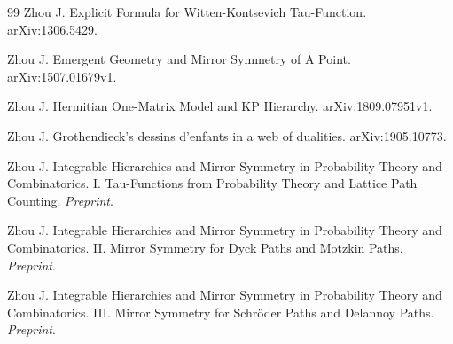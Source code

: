 \documentclass[a4paper]{article}
\theoremstyle{plain}
\theoremstyle{definition}
\begin{document}
\begin{thebibliography}{99}
Zhou J. Explicit Formula for Witten-Kontsevich Tau-Function. arXiv:1306.5429.

Zhou J. Emergent Geometry and Mirror Symmetry of A Point. arXiv:1507.01679v1.

Zhou J. Hermitian One-Matrix Model and KP Hierarchy. arXiv:1809.07951v1.

Zhou J. Grothendieck's dessins d'enfants in a web of dualities. arXiv:1905.10773.

Zhou J. Integrable Hierarchies and Mirror Symmetry in Probability Theory and Combinatorics. I. Tau-Functions from Probability Theory and Lattice Path Counting. {\it Preprint}.

Zhou J. Integrable Hierarchies and Mirror Symmetry in Probability Theory and Combinatorics. II. Mirror Symmetry for Dyck Paths and Motzkin Paths. {\it Preprint}.

Zhou J. Integrable Hierarchies and Mirror Symmetry in Probability Theory and Combinatorics. III. Mirror Symmetry for Schr\"oder Paths and Delannoy Paths. {\it Preprint}.
	
\end{thebibliography}
\end{document}
